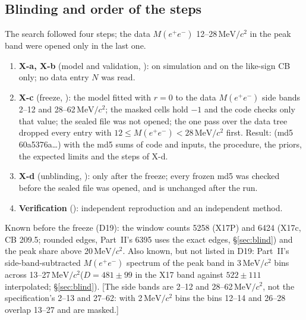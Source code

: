 \documentclass[11pt,a4paper]{article}
\newcommand{\Mee}{\ensuremath{M(e^{+}e^{-})}\xspace}
\newcommand{\MeVcc}{\ensuremath{\mathrm{MeV}/c^{2}}\xspace}
\newcommand{\code}[1]{\texttt{\detokenize{#1}}}
\newcommand{\flag}[1]{\textcolor{red!60!black}{[#1]}}
\begin{document}
\subsection{Blinding and order of the steps}
\label{sec:x17blind}
The search followed four steps; the data \Mee 12--28\,\MeVcc in the peak band were opened only in the last one.
\begin{enumerate}\setlength{\itemsep}{0pt}
\item \textbf{X-a, X-b} (model and validation, \code{x17ab}): on simulation and on the like-sign CB only; no data entry $N$ was read.
\item \textbf{X-c} (freeze, \code{x17c}): the model fitted with $r=0$ to the data \Mee side bands 2--12 and 28--62\,\MeVcc; the masked cells hold $-1$
      and the code checks only that value; the sealed file was not opened; the one pass over the data tree dropped every entry with
      $12\le\Mee<28$\,\MeVcc first. Result: \code{x17_frozen.txt} (md5 60a5376a\dots) with the md5 sums of code and inputs, the procedure, the priors,
      the expected limits and the steps of X-d.
\item \textbf{X-d} (unblinding, \code{x17d}): only after the freeze; every frozen md5 was checked before the sealed file was opened, and is
      unchanged after the run.
\item \textbf{Verification} (\code{vx}): independent reproduction and an independent method.
\end{enumerate}
Known before the freeze (D19): the window counts 5258 (X17P) and 6424 (X17c, CB 209.5; rounded edges, Part~II's 6395 uses the exact edges,
\S\ref{sec:blind}) and the peak share above 20\,\MeVcc. Also known, but not
listed in D19: Part~II's side-band-subtracted \Mee spectrum of the peak band in 3\,\MeVcc bins across 13--27\,\MeVcc ($D=481\pm99$ in the X17 band
against $522\pm111$ interpolated; \S\ref{sec:blind}). \flag{The side bands
are 2--12 and 28--62\,\MeVcc, not the specification's 2--13 and 27--62: with 2\,\MeVcc bins the bins 12--14 and 26--28 overlap 13--27 and are
masked.}
\end{document}
